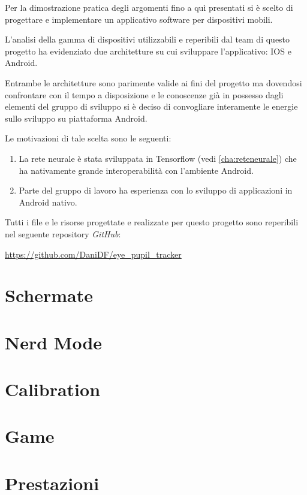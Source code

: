Per la  dimostrazione pratica degli argomenti fino a quì presentati si è scelto di progettare e implementare un applicativo software per dispositivi mobili.

L'analisi della gamma di dispositivi utilizzabili e reperibili dal team di questo progetto ha evidenziato due architetture su cui sviluppare l'applicativo: IOS e Android.

Entrambe le architetture sono parimente valide ai fini del progetto ma dovendosi confrontare con il tempo a disposizione e le conoscenze già in possesso dagli elementi del gruppo di sviluppo si è deciso di convogliare interamente le energie sullo sviluppo su piattaforma Android.

Le motivazioni di tale scelta sono le seguenti:

\begin{enumerate}
    \item La rete neurale è stata sviluppata in Tensorflow (vedi \ref{cha:reteneurale}) che ha nativamente grande interoperabilità con l'ambiente Android.
    \item Parte del gruppo di lavoro ha esperienza con lo sviluppo di applicazioni in Android nativo.
\end{enumerate}

Tutti i file e le risorse progettate e realizzate per questo progetto sono reperibili nel seguente repository \textit{GitHub}:

\begin{center}
    \url{https://github.com/DaniDF/eye_pupil_tracker}
\end{center}

\section{Schermate}
\label{sec:schermate}


\section{Nerd Mode}
\label{sec:nerdmde}


\section{Calibration}
\label{sec:calibration}


\section{Game}
\label{sec:game}


\section{Prestazioni}
\label{sec:prestazioni}
